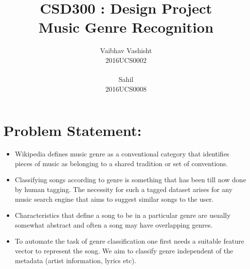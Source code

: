 \documentclass[]{report}
\title{\centering CSD300 : Design Project \\Music Genre Recognition}
\author{\LARGE Vaibhav Vashisht\\ \LARGE 2016UCS0002\\ \\ \LARGE Sahil\\ \LARGE 2016UCS0008}
\begin{document}
 

\maketitle

\section{Problem Statement:}
\large 
\begin{itemize}
	\item Wikipedia defines music genre as a conventional category that identifies pieces of music as belonging to a shared tradition or set of conventions.
	\item Classifying songs according to genre is something that has been till now done by human tagging. The necessity for such a tagged dataset arises for any music search engine that aims to suggest similar songs to the user.
	\item Characteristics that define a song to be in a particular genre are usually somewhat abstract and often a song may have overlapping genres. 
	\item To automate the task of genre classification one first needs a suitable feature vector to represent the song. We aim to classify genre independent of the metadata (artist information, lyrics etc).
\end{itemize}  
\end{document}
